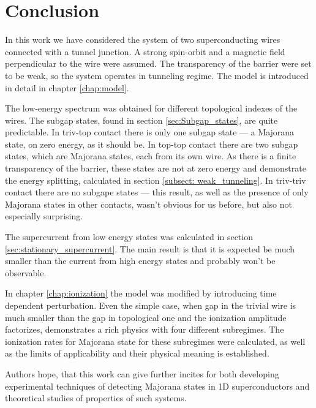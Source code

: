 \chapter{Conclusion}
\label{chap:conclision}
In this work we have considered the system of two superconducting wires connected with a tunnel junction. A strong spin-orbit and a magnetic field perpendicular to the wire were assumed. The transparency of the barrier were set to be weak, so the system operates in tunneling regime. The model is introduced in detail in chapter \ref{chap:model}.

The low-energy spectrum was obtained for different topological indexes of the wires. The subgap states, found in section \ref{sec:Subgap_states}, are quite predictable.  In triv-top contact there is only one subgap state --- a Majorana state, on zero energy, as it should be. In top-top contact there are two subgap states, which are Majorana states, each from its own wire. As there is a finite transparency of the barrier, these states are not at zero energy and demonstrate the energy splitting, calculated in section \ref{subsect: weak_tunneling}. In triv-triv contact there are no subgape states --- this result, as well as the presence of only Majorana states in other contacts, wasn't obvious for us before, but also not especially surprising.

The supercurrent from low energy states was calculated in section \ref{sec:stationary_supercurrent}. The main result is that it is expected be much smaller than the current from high energy states and probably won't be observable.

In chapter \ref{chap:ionization} the model was modified by introducing time dependent perturbation. Even the simple case, when gap in the trivial wire is much smaller than the gap in topological one and the ionization amplitude factorizes, demonstrates a rich physics with four different subregimes. The ionization rates for Majorana state for these subregimes were calculated, as well as the limits of applicability and their physical meaning is established.

Authors hope, that this work can give further incites for both developing experimental techniques of detecting Majorana states in 1D superconductors and theoretical studies of properties of such systems.